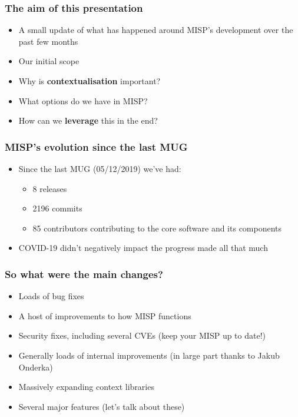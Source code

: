 
\begin{frame}
\titlepage
\end{frame}

\begin{frame}
  \frametitle{The aim of this presentation}
  \begin{itemize}
     \item A small update of what has happened around MISP's development over the past few months
     \item Our initial scope
     \item Why is {\bf contextualisation} important?
     \item What options do we have in MISP?
     \item How can we {\bf leverage} this in the end?
  \end{itemize}
\end{frame}

\begin{frame}
  \frametitle{MISP's evolution since the last MUG}
  \begin{itemize}
    \item Since the last MUG (05/12/2019) we've had:
    \begin{itemize}
        \item 8 releases
        \item 2196 commits
        \item 85 contributors contributing to the core software and its components
    \end{itemize}
    \item COVID-19 didn't negatively impact the progress made all that much
  \end{itemize}
\end{frame}

\begin{frame}
  \frametitle{So what were the main changes?}
  \begin{itemize}
     \item Loads of bug fixes
     \item A host of improvements to how MISP functions
     \item Security fixes, including several CVEs (keep your MISP up to date!)
     \item Generally loads of internal improvements (in large part thanks to Jakub Onderka)
     \item Massively expanding context libraries
     \item Several major features (let's talk about these)
  \end{itemize}
\end{frame}

